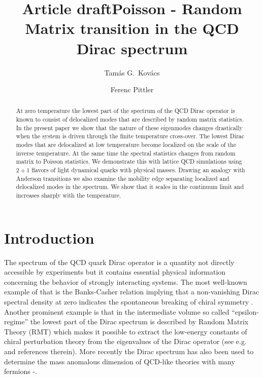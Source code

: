 \documentclass[twocolumn, prd, preprintnumbers, amsmath,
  amssymb, showpacs, floatfix]{revtex4-1}
\title{Article draft}
\begin{document}
\title{Poisson - Random Matrix transition in the QCD Dirac spectrum}

\author{Tam\'as G.\ Kov\'acs}
\author{Ferenc Pittler}
\pacs{}

\begin{abstract}
At zero temperature the lowest part of the spectrum of the QCD Dirac operator
is known to consist of delocalized modes that are described by random matrix
statistics.  In the present paper we show that the nature of these eigenmodes
changes drastically when the system is driven through the finite temperature
cross-over. The lowest Dirac modes that are delocalized at low temperature
become localized on the scale of the inverse temperature. At the same time the
spectral statistics changes from random matrix to Poisson statistics. We
demonstrate this with lattice QCD simulations using $2+1$ flavors of light
dynamical quarks with physical masses. Drawing an analogy with Anderson
transitions we also examine the mobility edge separating localized and
delocalized modes in the spectrum. We show that it scales in the continuum
limit and increases sharply with the temperature.
\end{abstract}
\maketitle

\section{Introduction}

The spectrum of the QCD quark Dirac operator is a quantity not directly
accessible by experiments but it contains essential physical information
concerning the behavior of strongly interacting systems. The most well-known
example of that is the Banks-Casher relation implying that a non-vanishing
Dirac spectral density at zero indicates the spontaneous breaking of chiral
symmetry \cite{Banks:1979yr}. Another prominent example is that in the
intermediate volume so called ``epsilon-regime'' the lowest part of the Dirac
spectrum is described by Random Matrix Theory (RMT) which makes it possible to
extract the low-energy constants of chiral perturbation theory from the
eigenvalues of the Dirac operator (see e.g.\ \cite{Verbaarschot:2000dy} and
references therein). More recently the Dirac spectrum has also been used to
determine the mass anomalous dimension of QCD-like theories with many fermions
\cite{DeGrand:2009et}-\cite{Cheng:2011ic}.
\end{document}
